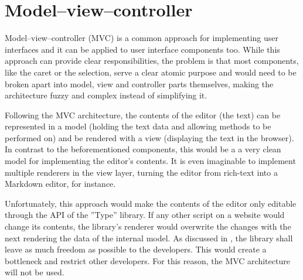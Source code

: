 

\section{Model--view--controller}
\label{sec:mvc_architecture}

Model--view--controller (MVC) is a common approach for implementing user interfaces and it can be applied to user interface components too. While this approach can provide clear responsibilities, the problem is that most components, like the caret or the selection, serve a clear atomic purpose and would need to be broken apart into model, view and controller parts themselves, making the architecture fuzzy and complex instead of simplifying it.

Following the MVC architecture, the contents of the editor (the text) can be represented in a model (holding the text data and allowing methods to be performed on) and be rendered with a view (displaying the text in the browser). In contrast to the beforementioned components, this would be a a very clean model for implementing the editor's contents. It is even imaginable to implement multiple renderers in the view layer, turning the editor from rich-text into a Markdown editor, for instance.

Unfortunately, this approach would make the contents of the editor only editable through the API of the ''Type'' library. If any other script on a website would change its contents, the library's renderer would overwrite the changes with the next rendering the data of the internal model. As discussed in , the library shall leave as much freedom as possible to the developers. This would create a bottleneck and restrict other developers. For this reason, the MVC architecture will not be used.

